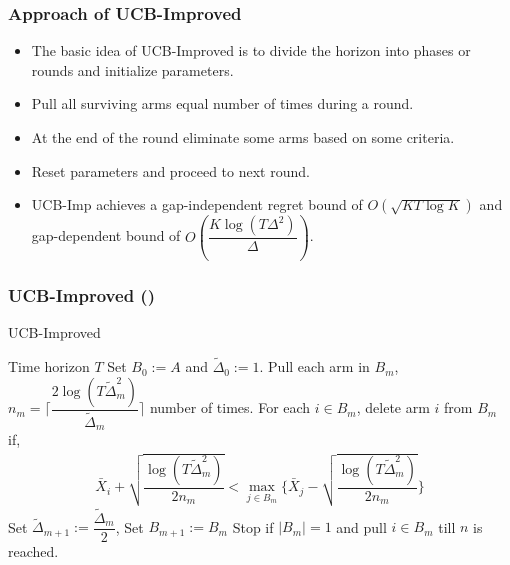 \begin{frame}
\frametitle{Approach of UCB-Improved}
\begin{itemize}
\item<1-> The basic idea of UCB-Improved is to divide the horizon into phases or rounds and initialize parameters.
\item<2-> Pull all surviving arms equal number of times during a round.
\item<3-> At the end of the round eliminate some arms based on some criteria.
\item<4-> Reset parameters and proceed to next round.
\item<5-> UCB-Imp achieves a gap-independent regret bound of $O\left( \sqrt{KT\log K}\right)$ and gap-dependent bound of $O\left( \dfrac{K \log (T\Delta^2)}{\Delta}\right)$.
\end{itemize}
\end{frame}

\begin{frame}
\frametitle{UCB-Improved (\cite{auer2010ucb})}
\begin{algorithm}[H]
\caption{UCB-Improved}
\begin{algorithmic}[1]
 Time horizon $T$
 Set $B_{0}:=A$ and $\tilde{\Delta}_{0}:=1$.
\State Pull each arm in $B_m$, $n_{m}=\bigg\lceil\dfrac{2\log{( T\tilde{\Delta}_{m}^{2})}}{\tilde{\Delta}_{m}}\bigg\rceil$ number of times.
\ArmElim
\State For each $i \in B_{m}$, delete arm ${i}$ from $B_{m}$ if,
\begin{align*}
\bar{X}_{i} + \sqrt{\dfrac{\log{(T\tilde{\Delta}_{m}^{2})}}{2 n_{m}}}  < \max_{{j}\in B_{m}}\bigg\lbrace\bar{X}_{j} -\sqrt{\dfrac{\log{( T\tilde{\Delta}_{m}^{2})}}{2 n_{m}}} \bigg\rbrace
\end{align*}
\EndArmElim
\State Set $\tilde{\Delta}_{m+1}:=\dfrac{\tilde{\Delta}_{m}}{2}$, Set $B_{m+1}:=B_{m}$
\State Stop if $|B_{m}|=1$ and pull ${i}\in B_{m}$ till $n$ is reached.
\EndFor
\end{algorithmic}
\end{algorithm}
\end{frame}

